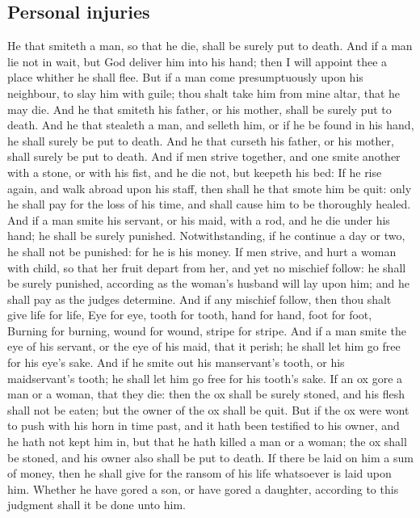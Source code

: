 \begin{biblechapter}
\section*{Personal injuries}
\verse He that smiteth a man, so that he die, shall be surely put to death.
\verse And if a man lie not in wait, but God deliver him into his hand; then I will appoint thee a place whither he shall flee.
\verse But if a man come presumptuously upon his neighbour, to slay him with guile; thou shalt take him from mine altar, that he may die.
\verse And he that smiteth his father, or his mother, shall be surely put to death.
\verse And he that stealeth a man, and selleth him, or if he be found in his hand, he shall surely be put to death.
\verse And he that curseth his father, or his mother, shall surely be put to death.
\verse And if men strive together, and one smite another with a stone, or with his fist, and he die not, but keepeth his bed:
\verse If he rise again, and walk abroad upon his staff, then shall he that smote him be quit: only he shall pay for the loss of his time, and shall cause him to be thoroughly healed.
\verse And if a man smite his servant, or his maid, with a rod, and he die under his hand; he shall be surely punished.
\verse Notwithstanding, if he continue a day or two, he shall not be punished: for he is his money.
\verse If men strive, and hurt a woman with child, so that her fruit depart from her, and yet no mischief follow: he shall be surely punished, according as the woman's husband will lay upon him; and he shall pay as the judges determine.
\verse And if any mischief follow, then thou shalt give life for life,
\verse Eye for eye, tooth for tooth, hand for hand, foot for foot,
\verse Burning for burning, wound for wound, stripe for stripe.
\verse And if a man smite the eye of his servant, or the eye of his maid, that it perish; he shall let him go free for his eye's sake.
\verse And if he smite out his manservant's tooth, or his maidservant's tooth; he shall let him go free for his tooth's sake.
\verse If an ox gore a man or a woman, that they die: then the ox shall be surely stoned, and his flesh shall not be eaten; but the owner of the ox shall be quit.
\verse But if the ox were wont to push with his horn in time past, and it hath been testified to his owner, and he hath not kept him in, but that he hath killed a man or a woman; the ox shall be stoned, and his owner also shall be put to death.
\verse If there be laid on him a sum of money, then he shall give for the ransom of his life whatsoever is laid upon him.
\verse Whether he have gored a son, or have gored a daughter, according to this judgment shall it be done unto him.

\end{biblechapter}
